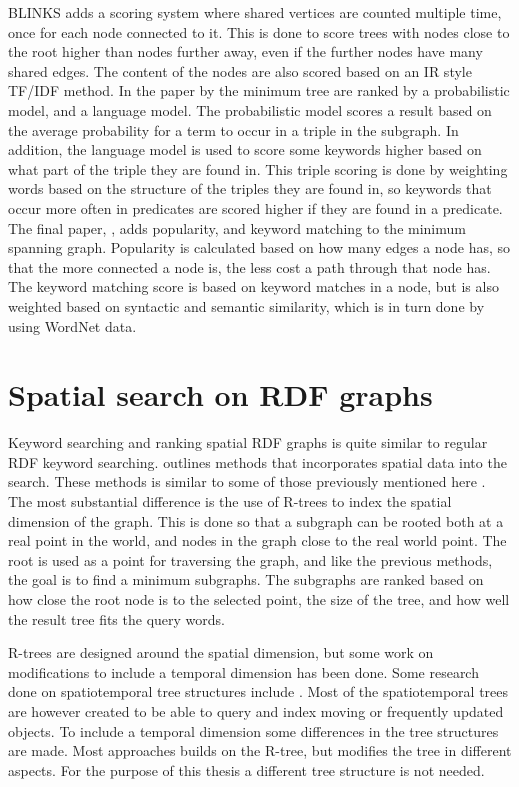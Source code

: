 BLINKS adds a scoring system where shared vertices are counted multiple time, once for each node connected to it. This is done to score trees with nodes close to the root higher than nodes further away, even if the further nodes have many shared edges. The content of the nodes are also scored based on an IR style TF/IDF method. In the paper by \cite{Elbassuoni:2011:KSO:2063576.2063615} the minimum tree are ranked by a probabilistic model, and a language model. The probabilistic model scores a result based on the average probability for a term to occur in a triple in the subgraph. In addition, the language model is used to score some keywords higher based on what part of the triple they are found in. This triple scoring is done by weighting words based on the structure of the triples they are found in, so keywords that occur more often in predicates are scored higher if they are found in a predicate. The final paper, \cite{4812421}, adds popularity, and keyword matching to the minimum spanning graph. Popularity is calculated based on how many edges a node has, so that the more connected a node is, the less cost a path through that node has. The keyword matching score is based on keyword matches in a node, but is also weighted based on syntactic and semantic similarity, which is in turn done by using WordNet data.


\section{Spatial search on RDF graphs}
Keyword searching and ranking spatial RDF graphs is quite similar to regular RDF keyword searching. \cite{Shi:2016:TRS:2882903.2882941} outlines methods that incorporates spatial data into the search. These methods is similar to some of those previously mentioned here \citep{4812421, Elbassuoni:2011:KSO:2063576.2063615}. The most substantial difference is the use of R-trees to index the spatial dimension of the graph. This is done so that a subgraph can be rooted both at a real point in the world, and nodes in the graph close to the real world point. The root is used as a point for traversing the graph, and like the previous methods, the goal is to find a minimum subgraphs. The subgraphs are ranked based on how close the root node is to the selected point, the size of the tree, and how well the result tree fits the query words.

R-trees are designed around the spatial dimension, but some work on modifications to include a temporal dimension has been done. Some research done on spatiotemporal tree structures include \citep{Tao:2003:TOS:1315451.1315519, r-tree-spatio-temporal}. Most of the spatiotemporal trees are however created to be able to query and index moving or frequently updated objects. To include a temporal dimension some differences in the tree structures are made. Most approaches builds on the R-tree, but modifies the tree in different aspects. For the purpose of this thesis a different tree structure is not needed.


\glsresetall